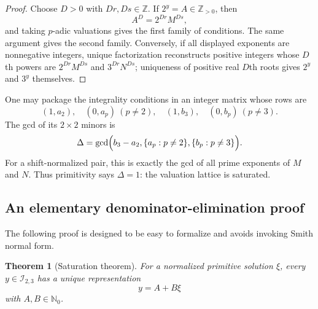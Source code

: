 \documentclass[11pt,oneside]{article}
\newtheorem{theorem}{Theorem}[section]
\theoremstyle{definition}
\newcommand{\N}{\mathbb N}
\newcommand{\Z}{\mathbb Z}
\newcommand{\Ispace}{\mathscr I_{2,3}}
\begin{document}
\begin{proof}
Choose $D>0$ with $Dr,Ds\in\Z$.  If $2^y=A\in\Z_{>0}$, then
\[
 A^D=2^{Dr}M^{Ds},
\]
and taking $p$-adic valuations gives the first family of conditions.  The same argument gives the second family.  Conversely, if all displayed exponents are nonnegative integers, unique factorization reconstructs positive integers whose $D$th powers are $2^{Dr}M^{Ds}$ and $3^{Dr}N^{Ds}$; uniqueness of positive real $D$th roots gives $2^y$ and $3^y$ themselves.
\end{proof}

One may package the integrality conditions in an integer matrix whose rows are
\[
 (1,a_2),\quad (0,a_p)\ (p\ne2),\quad
 (1,b_3),\quad (0,b_p)\ (p\ne3).
\]
The gcd of its $2\times2$ minors is
\begin{equation}\label{eq:saturation-index}
 \Delta=
 \gcd\Bigl(
   b_3-a_2,
   \{a_p:p\ne2\},
   \{b_p:p\ne3\}
 \Bigr).
\end{equation}
For a shift-normalized pair, this is exactly the gcd of all prime exponents of $M$ and $N$.  Thus primitivity says $\Delta=1$: the valuation lattice is saturated.

\subsection{An elementary denominator-elimination proof}

The following proof is designed to be easy to formalize and avoids invoking Smith normal form.

\begin{theorem}[Saturation theorem]
For a normalized primitive solution $\xi$, every $y\in\Ispace$ has a unique representation
\[
  y=A+B\xi
\]
with $A,B\in\N_0$.
\end{theorem}
\end{document}
